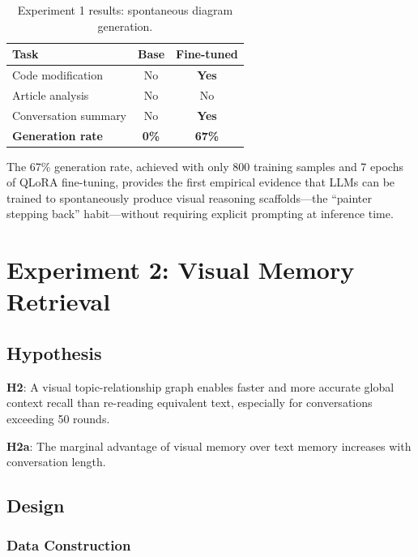 \documentclass[11pt,a4paper]{article}
\begin{document}
\begin{table}[h]
\centering
\caption{Experiment 1 results: spontaneous diagram generation.}
\label{tab:exp1_res}
\begin{tabular}{lcc}
\toprule
\textbf{Task} & \textbf{Base} & \textbf{Fine-tuned} \\
\midrule
Code modification     & No  & \textbf{Yes} \\
Article analysis      & No  & No  \\
Conversation summary  & No  & \textbf{Yes} \\
\midrule
\textbf{Generation rate} & \textbf{0\%} & \textbf{67\%} \\
\bottomrule
\end{tabular}
\end{table}

The 67\% generation rate, achieved with only 800 training samples and 7 epochs of QLoRA fine-tuning, provides the first empirical evidence that LLMs can be trained to spontaneously produce visual reasoning scaffolds---the ``painter stepping back'' habit---without requiring explicit prompting at inference time.


\section{Experiment 2: Visual Memory Retrieval}

\subsection{Hypothesis}

\textbf{H2}: A visual topic-relationship graph enables faster and more accurate global context recall than re-reading equivalent text, especially for conversations exceeding 50 rounds.

\textbf{H2a}: The marginal advantage of visual memory over text memory increases with conversation length.

\subsection{Design}

\subsubsection{Data Construction}
\end{document}
